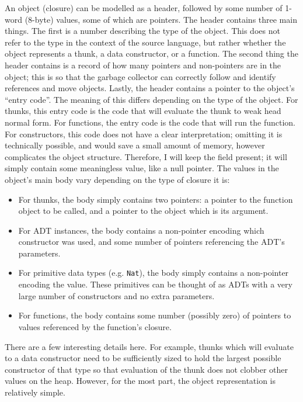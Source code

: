 \documentclass[9pt]{extarticle}
\begin{document}
An object (closure) can be modelled as a header, followed by some number
of 1-word (8-byte) values, some of which are pointers. The header
contains three main things. The first is a number describing the type of
the object. This does not refer to the type in the context of the source
language, but rather whether the object represents a thunk, a data
constructor, or a function. The second thing the header contains is a
record of how many pointers and non-pointers are in the object; this is
so that the garbage collector can correctly follow and identify
references and move objects. Lastly, the header contains a pointer to
the object's ``entry code''. The meaning of this differs depending on
the type of the object. For thunks, this entry code is the code that
will evaluate the thunk to weak head normal form. For functions, the
entry code is the code that will run the function. For constructors,
this code does not have a clear interpretation; omitting it is
technically possible, and would save a small amount of memory, however
complicates the object structure. Therefore, I will keep the field
present; it will simply contain some meaningless value, like a null
pointer. The values in the object's main body vary depending on the type
of closure it is:

\begin{itemize}
  \item For thunks, the body simply contains two pointers: a pointer to
    the function object to be called, and a pointer to the object which
    is its argument.

  \item For ADT instances, the body contains a non-pointer encoding
    which constructor was used, and some number of pointers referencing
    the ADT's parameters.

  \item For primitive data types (e.g. \verb'Nat'), the body simply
    contains a non-pointer encoding the value. These primitives can be
    thought of as ADTs with a very large number of constructors and no
    extra parameters.

  \item For functions, the body contains some number (possibly zero) of
    pointers to values referenced by the function's closure.
\end{itemize}

There are a few interesting details here. For example, thunks which will
evaluate to a data constructor need to be sufficiently sized to hold the
largest possible constructor of that type so that evaluation of the
thunk does not clobber other values on the heap. However, for the most
part, the object representation is relatively simple.
\end{document}
